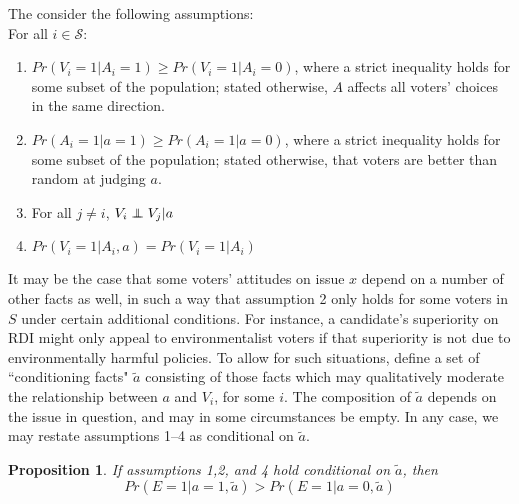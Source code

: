 \documentclass[11pt]{article}
\def\independenT#1#2{\mathrel{\rlap{$#1#2$}\mkern2mu{#1#2}}}
\newcommand\independent{\protect\mathpalette{\protect\independenT}{\perp}}
\newtheorem*{prop*}{Proposition}
\begin{document}
The consider the following assumptions:\\
For all $i\in\mathcal{S}$:
\begin{enumerate}
\item $Pr(V_i=1|A_i=1)\ge Pr(V_i=1|A_i=0)$, where a strict inequality holds for some subset of the population; stated otherwise, $A$ affects all voters' choices in the same direction.
\item $Pr(A_i=1|a=1)\ge Pr(A_i=1|a=0)$, where a strict inequality holds for some subset of the population; stated otherwise, that voters are better than random at judging $a$.
\item For all $j\ne i$, $V_i \independent V_j|a$
\item $Pr(V_i=1|A_i, a)=Pr(V_i=1|A_i)$
\end{enumerate}

It may be the case that some voters' attitudes on issue $x$ depend on a number of other facts as well,  in such a way that assumption 2 only holds for some voters in $S$ under certain additional conditions.
For instance, a candidate's superiority on RDI might only appeal to environmentalist voters if that superiority is not due to environmentally harmful policies.
To allow for such situations, define a set of ``conditioning facts" $\tilde{a}$ consisting of those facts which may qualitatively moderate the relationship between $a$ and $V_i$, for some $i$.
The composition of $\tilde{a}$ depends on the issue in question, and may in some circumstances be empty.
In any case, we may restate assumptions 1--4 as conditional on $\tilde{a}$.

\begin{prop*}
If assumptions 1,2, and 4 hold conditional on $\tilde{a}$, then
\begin{equation}
Pr(E=1|a=1,\tilde{a})>Pr(E=1|a=0,\tilde{a})
\end{equation}
\end{prop*}
\end{document}
